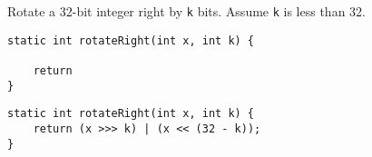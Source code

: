 %
\question Rotate a 32-bit integer right by \texttt{k} bits. Assume \texttt{k} is less than 32.

\ifprintanswers\else
\begin{lstlisting}
static int rotateRight(int x, int k) {

    return
}
\end{lstlisting}
\fi

\begin{solution}
\begin{lstlisting}
static int rotateRight(int x, int k) {
    return (x >>> k) | (x << (32 - k));
}
\end{lstlisting}
\end{solution}